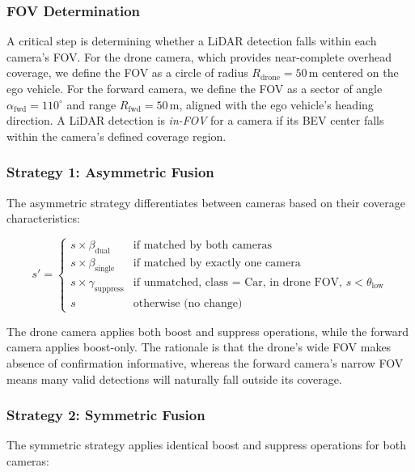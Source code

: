 \documentclass[sustainability,article,submit,moreauthors,pdftex]{Definitions/mdpi}
\begin{document}
\subsubsection{FOV Determination}

A critical step is determining whether a LiDAR detection falls within each camera's FOV. For the drone camera, which provides near-complete overhead coverage, we define the FOV as a circle of radius $R_{\mathrm{drone}} = 50$\,m centered on the ego vehicle. For the forward camera, we define the FOV as a sector of angle $\alpha_{\mathrm{fwd}} = 110^\circ$ and range $R_{\mathrm{fwd}} = 50$\,m, aligned with the ego vehicle's heading direction. A LiDAR detection is \emph{in-FOV} for a camera if its BEV center falls within the camera's defined coverage region.

\subsubsection{Strategy 1: Asymmetric Fusion}\label{sec:asymmetric}

The asymmetric strategy differentiates between cameras based on their coverage characteristics:

\begin{equation}\label{eq:asymmetric_rules}
s' = \begin{cases}
s \times \beta_{\mathrm{dual}} & \text{if matched by both cameras} \\
s \times \beta_{\mathrm{single}} & \text{if matched by exactly one camera} \\
s \times \gamma_{\mathrm{suppress}} & \text{if unmatched, class = Car, in drone FOV, } s < \theta_{\mathrm{low}} \\
s & \text{otherwise (no change)}
\end{cases}
\end{equation}

\noindent The drone camera applies both boost and suppress operations, while the forward camera applies boost-only. The rationale is that the drone's wide FOV makes absence of confirmation informative, whereas the forward camera's narrow FOV means many valid detections will naturally fall outside its coverage.

\subsubsection{Strategy 2: Symmetric Fusion}\label{sec:symmetric}

The symmetric strategy applies identical boost and suppress operations for both cameras:
\end{document}

